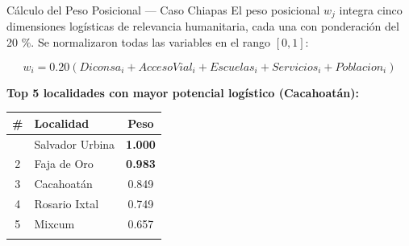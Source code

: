 \documentclass[
  ignorenonframetext,
]{beamer}
\begin{document}
\begin{frame}{Cálculo del Peso Posicional --- Caso Chiapas}
\label{cuxe1lculo-del-peso-posicional-caso-chiapas}
El peso posicional \(w_j\) integra cinco dimensiones logísticas de
relevancia humanitaria, cada una con ponderación del 20 \%. Se
normalizaron todas las variables en el rango \([0,1]\):

\[w_i = 0.20 (Diconsa_i +  AccesoVial_i +  Escuelas_i +  Servicios_i + Poblacion_i)\]

\textbf{Top 5 localidades con mayor potencial logístico (Cacahoatán):}

\begin{longtable}[]{@{}clc@{}}
\toprule\noalign{}
\textbf{\#} & \textbf{Localidad} & \textbf{Peso} \\
\midrule\noalign{}
\endhead
1 & Salvador Urbina & \textbf{1.000} \\
2 & Faja de Oro & \textbf{0.983} \\
3 & Cacahoatán & 0.849 \\
4 & Rosario Ixtal & 0.749 \\
5 & Mixcum & 0.657 \\
\bottomrule\noalign{}
\end{longtable}
\end{frame}
\end{document}
